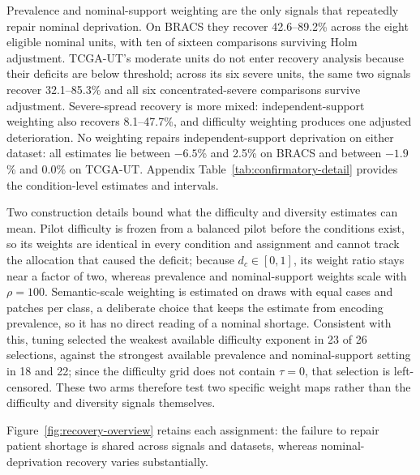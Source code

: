 \documentclass[11pt]{article}
\newcommand{\resultstable}[1]{}
\begin{document}
\begin{table}[ht]
  \centering
  \scriptsize
  \setlength{\tabcolsep}{4pt}
  \resultstable{confirmatory_summary}
  \caption{Balanced-accuracy recovery by shortage and weighting signal. Ranges are percentages of the original deficit; the final column counts results that remain significant after Holm adjustment.}
  \label{tab:confirmatory}
\end{table}

\noindent Prevalence and nominal-support weighting are the only signals that repeatedly repair nominal deprivation. On BRACS they recover \num{42.6}--\num{89.2}\% across the eight eligible nominal units, with ten of sixteen comparisons surviving Holm adjustment. TCGA-UT's moderate units do not enter recovery analysis because their deficits are below threshold; across its six severe units, the same two signals recover \num{32.1}--\num{85.3}\% and all six concentrated-severe comparisons survive adjustment. Severe-spread recovery is more mixed: independent-support weighting also recovers \num{8.1}--\num{47.7}\%, and difficulty weighting produces one adjusted deterioration. No weighting repairs independent-support deprivation on either dataset: all estimates lie between $-\num{6.5}$\% and \num{2.5}\% on BRACS and between $-\num{1.9}$\% and \num{0.0}\% on TCGA-UT. Appendix Table~\ref{tab:confirmatory-detail} provides the condition-level estimates and intervals.

Two construction details bound what the difficulty and diversity estimates can mean. Pilot difficulty is frozen from a balanced pilot before the conditions exist, so its weights are identical in every condition and assignment and cannot track the allocation that caused the deficit; because $d_c\in[0,1]$, its weight ratio stays near a factor of two, whereas prevalence and nominal-support weights scale with $\rho=100$. Semantic-scale weighting is estimated on draws with equal cases and patches per class, a deliberate choice that keeps the estimate from encoding prevalence, so it has no direct reading of a nominal shortage. Consistent with this, tuning selected the weakest available difficulty exponent in \num{23} of \num{26} selections, against the strongest available prevalence and nominal-support setting in \num{18} and \num{22}; since the difficulty grid does not contain $\tau=0$, that selection is left-censored. These two arms therefore test two specific weight maps rather than the difficulty and diversity signals themselves.

Figure~\ref{fig:recovery-overview} retains each assignment: the failure to repair patient shortage is shared across signals and datasets, whereas nominal-deprivation recovery varies substantially.
\end{document}
